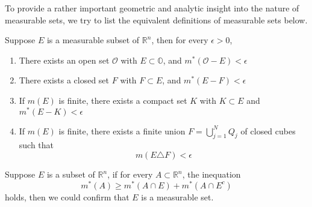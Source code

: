 \documentclass{ctexbook}
\begin{document}
To provide a rather important geometric and analytic insight into the nature of measurable sets, we try to list the
equivalent definitions of measurable sets below.
\begin{thm}
    Suppose $E$ is a measurable subset of $\mathbb{R}^n$, then for every $\epsilon>0$,
    \begin{enumerate}
        \item There exists an open set $\mathcal{O}$ with $E \subset \mathbb{O}$, and $m^*(\mathcal{O} - E) < \epsilon$
        \item There exists a closed set $F$ with $F \subset E$, and $m^*(E-F)<\epsilon$
        \item If $m(E)$ is finite, there exists a compact set $K$ with $K \subset E$ and $m^*(E-K) < \epsilon$
        \item If $m(E)$ is finite, there exists a finite union $F=\bigcup\limits_{j=1}^N Q_j$ of closed cubes such that \[m(E\triangle F)<\epsilon\]
    \end{enumerate}
\end{thm}
\begin{thm}
    Suppose $E$ is a subset of $\mathbb{R}^n$, if for every $A\subset \mathbb{R}^n$, the inequation
    \[m^*(A) \geq m^*(A\cap E)+m^*(A\cap E^c)\]
    holds, then we could confirm that $E$ is a measurable set.
\end{thm}
\end{document}
